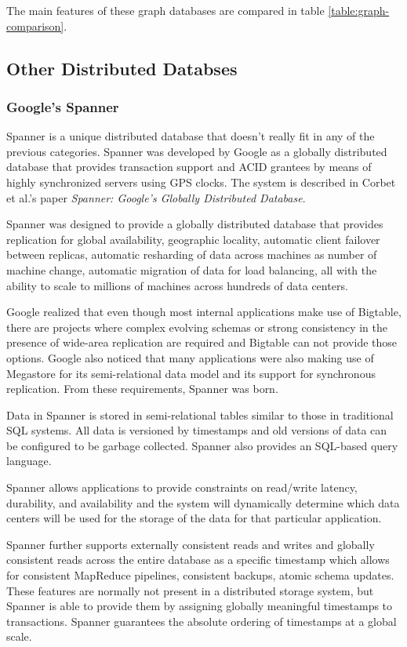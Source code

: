 \documentclass[]{article}
\begin{document}
The main features of these graph databases are compared in table \ref{table:graph-comparison}.

\subsection{Other Distributed Databses}\label{ssec:misc}
\subsubsection{Google's Spanner}\label{sssec:googles-spanner}
Spanner is a unique distributed database that doesn't really fit in any of the previous categories. Spanner was developed by Google as a globally distributed database that provides transaction support and ACID grantees by means of highly synchronized servers using GPS clocks. The system is described in Corbet et al.'s paper  \textit{Spanner: Google's Globally Distributed Database}\cite{corbett_spanner:_2013}.

Spanner was designed to provide a globally distributed database that provides replication for global availability, geographic locality, automatic client failover between replicas, automatic resharding of data across machines as number of machine change, automatic migration of data for load balancing, all with the ability to scale to millions of machines across hundreds of data centers.

Google realized that even though most internal applications make use of Bigtable, there are projects where complex evolving schemas or strong consistency in the presence of wide-area replication are required and Bigtable can not provide those options. Google also noticed that many applications were also making use of Megastore for its semi-relational data model and its support for synchronous replication. From these requirements, Spanner was born.

Data in Spanner is stored in semi-relational tables similar to those in traditional SQL systems. All data is versioned by timestamps and old versions of data can be configured to be garbage collected. Spanner also provides an SQL-based query language.

Spanner allows applications to provide constraints on read/write latency, durability, and availability and the system will dynamically determine which data centers will be used for the storage of the data for that particular application.

Spanner further supports externally consistent reads and writes and globally consistent reads across the entire database as a specific timestamp which allows for consistent MapReduce pipelines, consistent backups, atomic schema updates. These features are normally not present in a distributed storage system, but Spanner is able to provide them by assigning globally meaningful timestamps to transactions. Spanner guarantees the absolute ordering of timestamps at a global scale.
\end{document}
